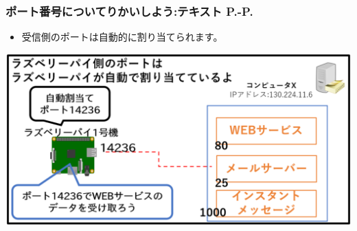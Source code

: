 \documentclass[dvipdfmx]{beamer}
\begin{document}
\begin{frame}[fragile]
	\frametitle{\large{ポート番号についてりかいしよう:テキスト P.\pageref{1:P:port}-P.\pageref{1:P:DNS}}~~~}
            \begin{itemize}
                \item 受信側のポートは自動的に割り当てられます。
            \end{itemize}
			\begin{minipage}{\textwidth}
                {\upshape
                  \includegraphics[width=\textwidth]{slide07-img013.png}}
            \end{minipage}
\end{frame}
\end{document}
